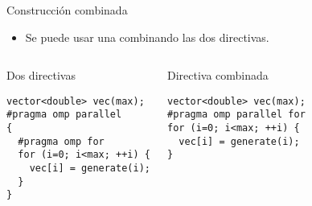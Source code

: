 \begin{frame}[t,fragile]{Construcción combinada}
\begin{itemize}
  \item Se puede usar una  combinando las dos directivas.
\end{itemize}

\begin{columns}[T]


\begin{block}{Dos directivas}
\begin{lstlisting}
vector<double> vec(max);
#pragma omp parallel
{
  #pragma omp for
  for (i=0; i<max; ++i) {
    vec[i] = generate(i);
  }
}
\end{lstlisting}
\end{block}


\begin{block}{Directiva combinada}
\begin{lstlisting}
vector<double> vec(max);
#pragma omp parallel for
for (i=0; i<max; ++i) {
  vec[i] = generate(i);
}
\end{lstlisting}
\end{block}

\end{columns}
\end{frame}


